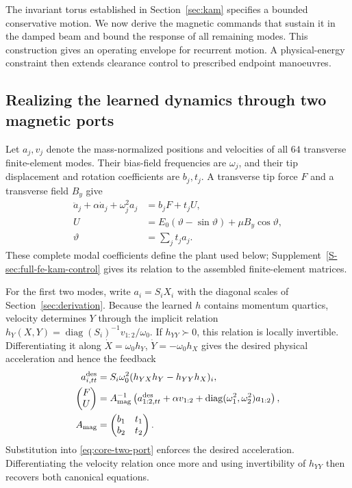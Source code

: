 The invariant torus established in Section~\ref{sec:kam} specifies a bounded conservative motion. We now derive the magnetic commands that sustain it in the damped beam and bound the response of all remaining modes. This construction gives an operating envelope for recurrent motion. A physical-energy constraint then extends clearance control to prescribed endpoint manoeuvres.

\subsection{Realizing the learned dynamics through two magnetic ports}
Let $a_j,v_j$ denote the mass-normalized positions and velocities of all $64$ transverse finite-element modes. Their bias-field frequencies are $\omega_j$, and their tip displacement and rotation coefficients are $b_j,t_j$. A transverse tip force $F$ and a transverse field $B_y$ give
\begin{equation}
\begin{aligned}
 \ddot a_j+\alpha\dot a_j+\omega_j^2a_j&=b_jF+t_jU,\\
 U&=E_0(\vartheta-\sin\vartheta)+\mu B_y\cos\vartheta,\\
 \vartheta&=\sum_jt_ja_j .
\end{aligned}
\label{eq:core-two-port}
\end{equation}
These complete modal coefficients define the plant used below; Supplement~\ref{S-sec:full-fe-kam-control} gives its relation to the assembled finite-element matrices.

For the first two modes, write $a_i=S_iX_i$ with the diagonal scales of Section~\ref{sec:derivation}. Because the learned $h$ contains momentum quartics, velocity determines $Y$ through the implicit relation $h_Y(X,Y)=\operatorname{diag}(S_i)^{-1}v_{1:2}/\omega_0$. If $h_{YY}\succ0$, this relation is locally invertible. Differentiating it along $\dot X=\omega_0h_Y$, $\dot Y=-\omega_0h_X$ gives the desired physical acceleration and hence the feedback
\begin{equation}
\begin{aligned}
 a^{\rm des}_{i,tt}&=S_i\omega_0^2(h_{YX}h_Y-h_{YY}h_X)_i,\\
 \begin{pmatrix}F\\U\end{pmatrix}
 &=A_{\rm mag}^{-1}\left(a^{\rm des}_{1:2,tt}+\alpha v_{1:2}
       +\operatorname{diag}(\omega_1^2,\omega_2^2)a_{1:2}\right),\\
 A_{\rm mag}&=\begin{pmatrix}b_1&t_1\\b_2&t_2\end{pmatrix}.
\end{aligned}
\label{eq:core-feedback}
\end{equation}
Substitution into \eqref{eq:core-two-port} enforces the desired acceleration. Differentiating the velocity relation once more and using invertibility of $h_{YY}$ then recovers both canonical equations.

